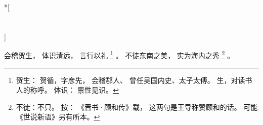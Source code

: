 
\switchcolumn[0]*[\section{}]

会稽贺生，
体识清远，
言行以礼%
\footnote{%
    贺生：
        贺循，字彦先，
        会稽郡人、
        曾任吴国内史、太子太傅。
        生，对读书人的称呼。
    体识：
        禀性见识。
}%
。
不徒东南之美，
实为海内之秀%
\footnote{%
    不徒：不只。
    按：
    《晋书·顾和传》载，
    这两句是王导称赞顾和的话。
    可能《世说新语》另有所本。
}%
。

\switchcolumn



